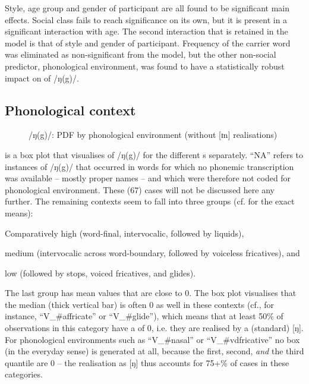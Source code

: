 Style, age group and gender of participant are all found to be significant main effects.
Social class fails to reach significance on its own, but it is present in a significant interaction with age.
The second interaction that is retained in the model is that of style and gender of participant.
Frequency of the carrier word was eliminated as non-significant from the model, but the other non-social predictor, phonological environment, was found to have a statistically robust impact on  of /ŋ(g)/.

\subsection{Phonological context}
\label{sec.prod.res.con.ng.phon}

\begin{figure}[h]
	\centering
		\resizebox{0.5\linewidth}{!}{} 
	\caption{/ŋ(g)/: PDF by phonological environment (without [ɪn] realisations)}
	\label{fig.box.ng.environment}
\end{figure}

 is a box plot that visualises  of /ŋ(g)/ for the different s separately.
``NA'' refers to instances of /ŋ(g)/ that occurred in words for which no phonemic transcription was available -- mostly proper names -- and which were therefore not coded for phonological environment.
These (67) cases will not be discussed here any further.
The remaining contexts seem to fall into three groups (cf.  for the exact means):
\begin{inparaenum}[(1)]
	\item Comparatively high  (word-final, intervocalic, followed by liquids),
	\item medium  (intervocalic across word-boundary, followed by voiceless fricatives), and
	\item low  (followed by stops, voiced fricatives, and glides).
\end{inparaenum}
The last group has mean  values that are close to 0.
The box plot visualises that the median (thick vertical bar) is often 0 as well in these contexts (cf., for instance, ``V\_\#affricate'' or ``V\_\#glide''), which means that at least 50\% of observations in this category have a  of 0, i.e. they are realised by a (standard) [ŋ].
For phonological environments such as ``V\_\#nasal'' or ``V\_\#vdfricative'' no box (in the everyday sense) is generated at all, because the first, second, \emph{and} the third quantile are 0 -- the realisation as [ŋ] thus accounts for 75+\% of cases in these categories.

